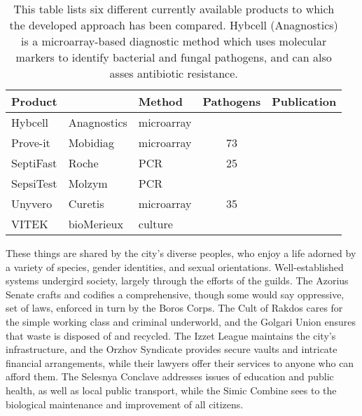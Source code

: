 \begin{table}[t!]
\caption[Currently available pathogen detection methods.]{This table lists six
different currently available products to which the developed approach has been
compared. Hybcell (Anagnostics) is a microarray-based diagnostic method which
uses molecular markers to identify bacterial and fungal pathogens, and can also
asses antibiotic resistance.}
\begin{tabularx}{\textwidth}{llXcr}
  Product   &             & Method     & Pathogens & Publication             \\
  \midrule
  Hybcell   & Anagnostics & microarray &           &                         \\
  Prove-it  & Mobidiag    & microarray & 73        & \citealp{Aittakorpi2012}\\
  SeptiFast & Roche       & PCR        & 25        & \citealp{Vince2008}     \\
  SepsiTest & Molzym      & PCR        &           &                         \\
  Unyvero   & Curetis     & microarray & 35        & \citealp{Jamal2014}     \\
  VITEK     & bioMerieux  & culture    &           &                         \\
  \bottomrule
\end{tabularx}
\label{tab:competitors}
\end{table}

These things are shared by the city's diverse peoples, who enjoy a life adorned
by a variety of  species, gender identities, and sexual orientations.
Well-established systems undergird society, largely through the efforts of the
guilds. The Azorius Senate crafts and codifies a comprehensive, though some
would say oppressive, set of laws, enforced in turn by the Boros Corps. The Cult
of Rakdos cares for the simple working class and criminal underworld, and the
Golgari Union ensures that waste is disposed of and recycled. The Izzet League
maintains the city's infrastructure, and the Orzhov Syndicate provides secure
vaults and intricate financial arrangements, while their lawyers offer their
services to anyone who can afford them. The Selesnya Conclave addresses issues
of education and public health, as well as local public transport, while the
Simic Combine sees to the biological maintenance and improvement of all
citizens.

